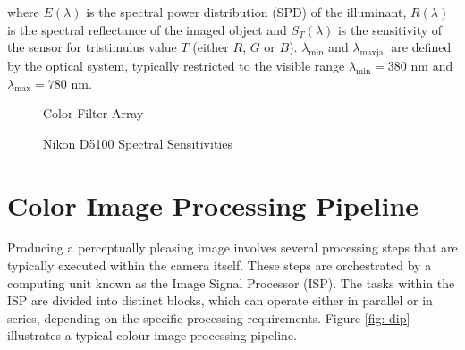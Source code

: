 where $E(\lambda)$ is the spectral power distribution (SPD) of the illuminant, $R(\lambda)$ is the spectral reflectance of the imaged object and $S_T(\lambda)$ is the sensitivity of the sensor for tristimulus value $T$ (either $R$, $G$ or $B$). $\lambda_{\text{min}}$ and $\lambda_{\text{maxja }}$ are defined by the optical system, typically restricted to the visible range $\lambda_{\text{min}}=380$ nm and $\lambda_{\text{max}} = 780$ nm.




\begin{figure}
\centering

\caption{Color Filter Array}
\label{fig:cfa}
\end{figure}

\begin{figure}
    \centering
    \caption{Nikon D5100 Spectral Sensitivities  \cite{D5100NPL}}
    \label{fig:d5100}
\end{figure}






\section{Color Image Processing Pipeline}

Producing a perceptually pleasing image involves several processing steps that are typically executed within the camera itself. These steps are orchestrated by a computing unit known as the Image Signal Processor (ISP). The tasks within the ISP are divided into distinct blocks, which can operate either in parallel or in series, depending on the specific processing requirements. Figure \ref{fig: dip} illustrates a typical colour image processing pipeline.

